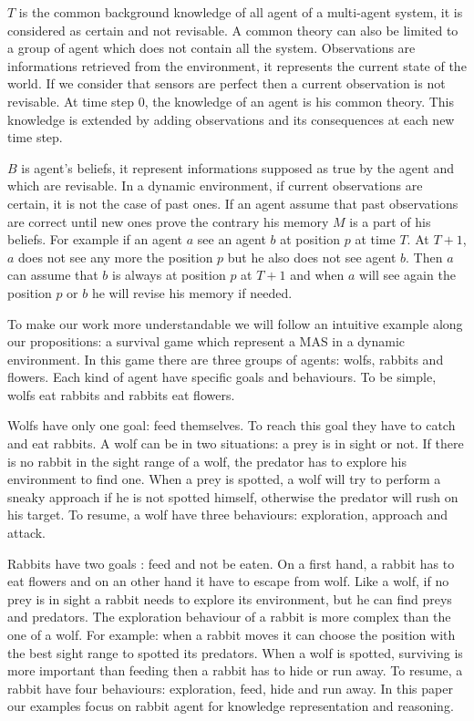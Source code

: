 \documentclass{aamas2012}
\begin{document}
	$T$ is the common background knowledge of all agent of a multi-agent system, it is considered as certain and not revisable.
	A common theory can also be limited to a group of agent which does not contain all the system.
	Observations are informations retrieved from the environment, it represents the current state of the world.
	If we consider that sensors are perfect then a current observation is not revisable.
	At time step 0, the knowledge of an agent is his common theory.
	This knowledge is extended by adding observations and its consequences at each new time step.

	$B$ is agent's beliefs, it represent informations supposed as true by the agent and which are revisable.
	In a dynamic environment, if current observations are certain, it is not the case of past ones.
	If an agent assume that past observations are correct until new ones prove the contrary his memory $M$ is a part of his beliefs.
	For example if an agent $a$ see an agent $b$ at position $p$ at time $T$.
	At $T+1$, $a$ does not see any more the position $p$ but he also does not see agent $b$.
	Then $a$ can assume that $b$ is always at position $p$ at $T+1$ and when $a$ will see again the position $p$ or $b$ he will revise his memory if needed.
	
	To make our work more understandable we will follow an intuitive example along our propositions: a survival game which represent a MAS in a dynamic environment.
	In this game there are three groups of agents: wolfs, rabbits and flowers.
	Each kind of agent have specific goals and behaviours.
	To be simple, wolfs eat rabbits and rabbits eat flowers.
	
	Wolfs have only one goal: feed themselves.
	To reach this goal they have to catch and eat rabbits.
	A wolf can be in two situations: a prey is in sight or not.
	If there is no rabbit in the sight range of a wolf, the predator has to explore his environment to find one.
	When a prey is spotted, a wolf will try to perform a sneaky approach if he is not spotted himself, otherwise the predator will rush on his target.
	To resume, a wolf have three behaviours: exploration, approach and attack.
	
	Rabbits have two goals : feed and not be eaten.
	On a first hand, a rabbit has to eat flowers and on an other hand it have to escape from wolf.
	Like a wolf, if no prey is in sight a rabbit needs to explore its environment, but he can find preys and predators.
	The exploration behaviour of a rabbit is more complex than the one of a wolf.
	For example: when a rabbit moves it can choose the position with the best sight range to spotted its predators.
	When a wolf is spotted, surviving is more important than feeding then a rabbit has to hide or run away.
	To resume, a rabbit have four behaviours: exploration, feed, hide and run away.
	In this paper our examples focus on rabbit agent for knowledge representation and reasoning.
	
\end{document}
